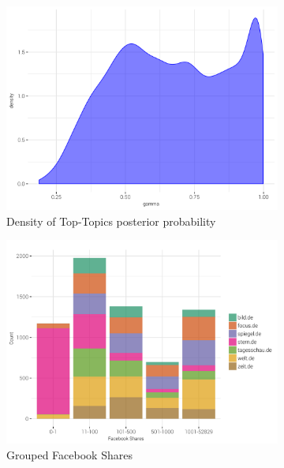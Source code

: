 \documentclass[12pt,a4paper,notitlepage]{article}
\begin{document}
{\begin{figure}[H]
	\caption{}
	\begin{center}
		\begin{subfigure}[normla]{0.49\textwidth}
			\includegraphics[width=\textwidth,keepaspectratio]{../figs/gamma_dist.png}
			\caption{Density of Top-Topics posterior probability}
			\label{fig_gamma}
		\end{subfigure}
		\begin{subfigure}[normla]{0.49\textwidth}
			\includegraphics[width=\textwidth,keepaspectratio]{../figs/facebook_shares.png}
			\caption{Grouped Facebook Shares}
			\label{fig_fb_shares}
		\end{subfigure}
		\begin{subfigure}[normla]{0.9\textwidth}

\end{subfigure}
\end{center}
\end{figure}}
\end{document}
